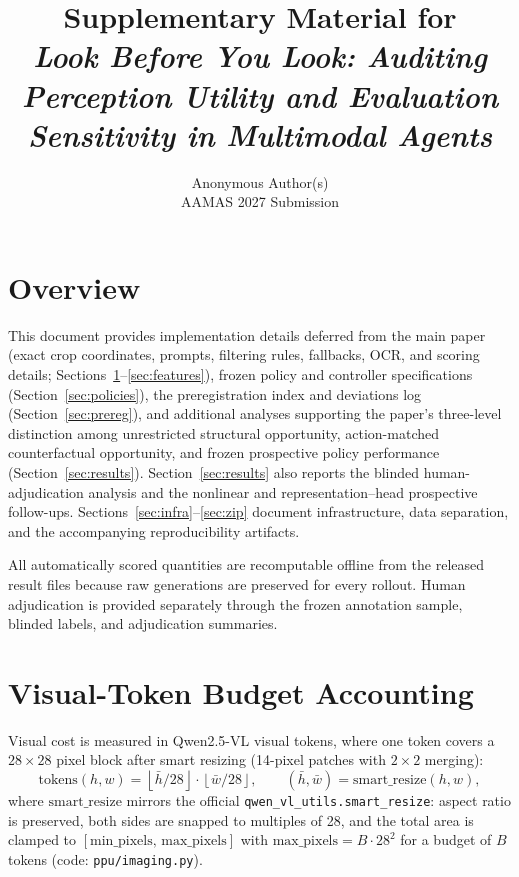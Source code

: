 \documentclass[10pt]{article}
\title{Supplementary Material for\\
\emph{Look Before You Look: Auditing Perception Utility and Evaluation
Sensitivity in Multimodal Agents}}
\author{Anonymous Author(s)\\AAMAS 2027 Submission}
\date{}
\begin{document}
\maketitle

\tableofcontents

\section*{Overview}

This document provides implementation details deferred from the main paper
(exact crop coordinates, prompts, filtering rules, fallbacks, OCR, and scoring
details; Sections~\ref{sec:budget}--\ref{sec:features}), frozen policy and
controller specifications (Section~\ref{sec:policies}), the preregistration
index and deviations log (Section~\ref{sec:prereg}), and additional analyses
supporting the paper's three-level distinction among unrestricted structural
opportunity, action-matched counterfactual opportunity, and frozen prospective
policy performance (Section~\ref{sec:results}). Section~\ref{sec:results}
also reports the blinded human-adjudication analysis and the nonlinear and
representation--head prospective follow-ups. Sections~\ref{sec:infra}--\ref{sec:zip}
document infrastructure, data separation, and the accompanying
reproducibility artifacts.

All automatically scored quantities are recomputable offline from the
released result files because raw generations are preserved for every
rollout. Human adjudication is provided separately through the frozen
annotation sample, blinded labels, and adjudication summaries.

\section{Visual-Token Budget Accounting}
\label{sec:budget}

Visual cost is measured in Qwen2.5-VL visual tokens, where one token covers
a $28\times28$ pixel block after smart resizing (14-pixel patches with
$2\times2$ merging):
\[
\text{tokens}(h,w) = \left\lfloor \bar h/28 \right\rfloor \cdot
\left\lfloor \bar w/28 \right\rfloor,
\qquad (\bar h,\bar w) = \mathrm{smart\_resize}(h,w),
\]
where $\mathrm{smart\_resize}$ mirrors the official
\texttt{qwen\_vl\_utils.smart\_resize}: aspect ratio is preserved, both
sides are snapped to multiples of 28, and the total area is clamped to
$[\text{min\_pixels},\,\text{max\_pixels}]$ with
$\text{max\_pixels} = B \cdot 28^2$ for a budget of $B$ tokens
(code: \texttt{ppu/imaging.py}).
\end{document}
